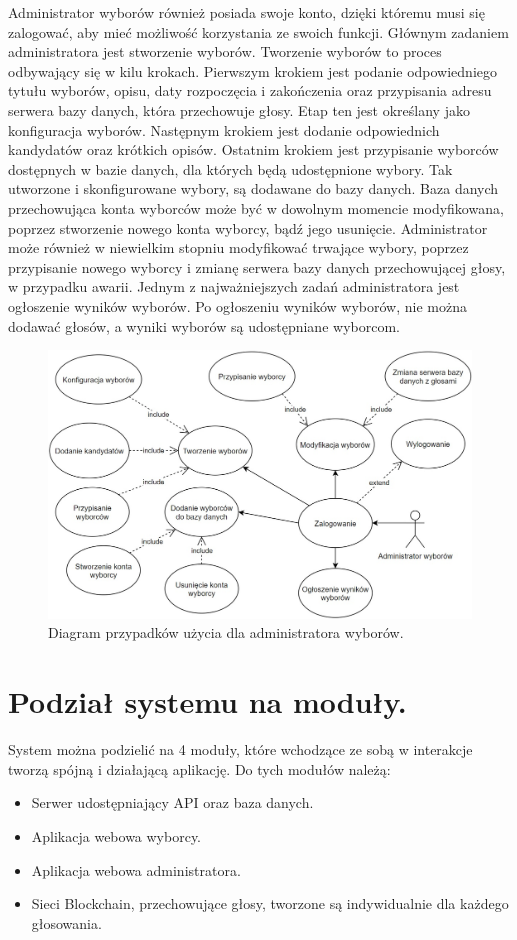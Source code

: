 \documentclass[a4paper,13pt]{report}
\begin{document}
Administrator wyborów również posiada swoje konto, dzięki któremu musi się zalogować, aby mieć możliwość korzystania ze swoich funkcji. Głównym zadaniem administratora jest stworzenie wyborów. Tworzenie wyborów to proces odbywający się w kilu krokach. Pierwszym krokiem jest podanie odpowiedniego tytułu wyborów, opisu, daty rozpoczęcia i zakończenia oraz przypisania adresu serwera bazy danych, która przechowuje głosy. Etap ten jest określany jako konfiguracja wyborów. Następnym krokiem jest dodanie odpowiednich kandydatów oraz krótkich opisów. Ostatnim krokiem jest przypisanie wyborców dostępnych w bazie danych, dla których będą udostępnione wybory. Tak utworzone i skonfigurowane wybory, są dodawane do bazy danych.
Baza danych przechowująca konta wyborców może być w dowolnym momencie modyfikowana, poprzez stworzenie nowego konta wyborcy, bądź jego usunięcie. Administrator może również w niewielkim stopniu modyfikować trwające wybory, poprzez przypisanie nowego wyborcy i zmianę serwera bazy danych przechowującej głosy, w przypadku awarii. Jednym z najważniejszych zadań administratora jest ogłoszenie wyników wyborów. Po ogłoszeniu wyników wyborów, nie można dodawać głosów, a wyniki wyborów są udostępniane wyborcom.

\begin{figure}[h]
    \centering
    \includegraphics[scale=0.4]{images/admin_use_case.jpg}
    \caption{Diagram przypadków użycia dla administratora wyborów.}
\end{figure}

\newpage

\section{Podział systemu na moduły.}
System można podzielić na 4 moduły, które wchodzące ze sobą w interakcje tworzą spójną i działającą aplikację. Do tych modułów należą:
\begin{itemize}
    \item Serwer udostępniający API oraz baza danych.
    \item Aplikacja webowa wyborcy.
    \item Aplikacja webowa administratora.
    \item Sieci Blockchain, przechowujące głosy, tworzone są indywidualnie dla każdego głosowania.
\end{itemize}
\end{document}
